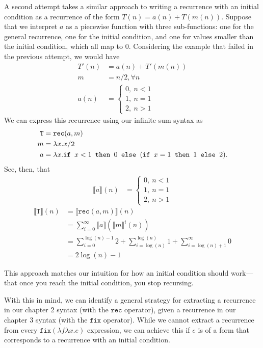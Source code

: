 A second attempt takes a similar approach to writing a recurrence with an initial condition as a recurrence of 
the form $T(n) = a(n) + T(m(n))$. Suppose that we interpret $a$ as a piecewise function with three sub-functions:
one for the general recurrence, one for the initial condition, and one for values smaller than the initial condition, which all
map to $0$. Considering the example that failed in the previous attempt, we would have
\begin{align*}
T'(n) &= a(n) + T'(m(n)) \\
m &= n/2, \forall n \\
a(n) &=
\begin{cases}
0, \ n < 1 \\
1, \ n = 1 \\
2, \ n > 1
\end{cases}
\end{align*}
We can express this recurrence using our infinite sum syntax as
\begin{align*}
\texttt{T} &= \texttt{rec}(a,m) \\
m &= \lambda x.x/\texttt{2} \\
a &= \lambda x.\texttt{if } x <1 \texttt{ then } 0 \texttt{ else } (\texttt{if } x = 1 \texttt{ then } 1 \texttt{ else } 2).
\end{align*}
See, then, that
\begin{align*}
\llbracket a \rrbracket(n) &= 
 \begin{cases}
0, \ n < 1 \\
1, \ n = 1 \\
2, \ n > 1 
\end{cases} 
\end{align*}
\begin{align*}
\llbracket \texttt{T} \rrbracket(n) &= \llbracket \texttt{rec}(a,m)\rrbracket(n) \\
&= \sum_{i=0}^{\infty}\llbracket a \rrbracket(\llbracket m\rrbracket^i(n)) \\
&= \sum_{i=0}^{\log(n)-1} 2 + \sum_{i=\log(n) }^{\log(n)} 1 + \sum_{i = \log(n) + 1}^{\infty} 0 \\
&= 2\log(n) - 1
\end{align*}

This approach matches our intuition for how an initial condition should work---that once you reach the initial condition,
you stop recursing. 

With this in mind, we can identify a general strategy for extracting a recurrence in our chapter 2 syntax (with
the $\texttt{rec}$ operator), given a recurrence in our chapter 3 syntax (with the $\texttt{fix}$ operator). 
While we cannot extract a recurrence from every $\texttt{fix}(\lambda f \lambda x.e)$ expression, we can achieve this
if $e$ is of a form that corresponds to a recurrence with an initial condition. 

